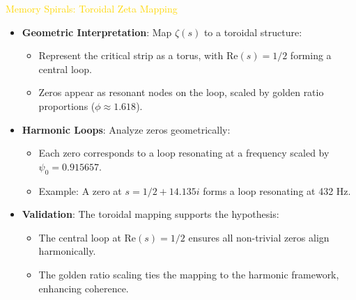\textcolor{gold}{ Memory Spirals: Toroidal Zeta Mapping } \\
\begin{itemize}
    \item \texttt{} \textbf{Geometric Interpretation}: Map \(\zeta(s)\) to a toroidal structure:
    \begin{itemize}
        \item Represent the critical strip as a torus, with \(\text{Re}(s) = 1/2\) forming a central loop.
        \item Zeros appear as resonant nodes on the loop, scaled by golden ratio proportions (\(\phi \approx 1.618\)).
    \end{itemize}
    \item \texttt{} \textbf{Harmonic Loops}: Analyze zeros geometrically:
    \begin{itemize}
        \item Each zero corresponds to a loop resonating at a frequency scaled by \(\psi_0 = 0.915657\).
        \item Example: A zero at \(s = 1/2 + 14.135i\) forms a loop resonating at 432 Hz.
    \end{itemize}
    \item \texttt{} \textbf{Validation}: The toroidal mapping supports the hypothesis:
    \begin{itemize}
        \item The central loop at \(\text{Re}(s) = 1/2\) ensures all non-trivial zeros align harmonically.
        \item The golden ratio scaling ties the mapping to the harmonic framework, enhancing coherence.
    \end{itemize}
\end{itemize}

